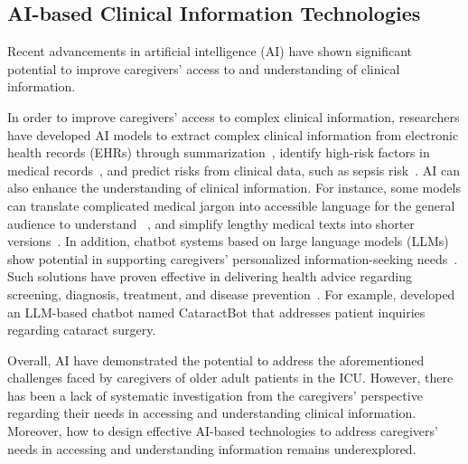 

\subsection{AI-based Clinical Information Technologies}
 
Recent advancements in artificial intelligence (AI) have shown significant potential to improve caregivers' access to and understanding of clinical information. 

In order to improve caregivers' access to complex clinical information, researchers have developed AI models to extract complex clinical information from electronic health records (EHRs) through summarization~\cite{Sette2023, Nikkhah2021, gopinath2020fast}, identify high-risk factors in medical records~\cite{corey2018development}, and predict risks from clinical data, such as sepsis risk~\cite{suresh2017clinical, yin2024sepsiscalc}. 
AI can also enhance the understanding of clinical information.
For instance, some models can translate complicated medical jargon into accessible language for the general audience to understand ~\cite{yim2024preliminary, wachter2024will, wong2018using}, and simplify lengthy medical texts into shorter versions~\cite{basu2023med, artsi2024large}. In addition, chatbot systems based on large language models (LLMs) show potential in supporting caregivers' personalized information-seeking needs~\cite{afshar2024prompt}. 
Such solutions have proven effective in delivering health advice regarding screening, diagnosis, treatment, and disease prevention~\cite{huo2025large}. 
For example, \citet{ramjee2024cataractbot} developed an LLM-based chatbot named CataractBot that addresses patient inquiries regarding cataract surgery.

Overall, AI have demonstrated the potential to address the aforementioned challenges faced by caregivers of older adult patients in the ICU. 
However, there has been a lack of systematic investigation from the caregivers' perspective regarding their needs in accessing and understanding clinical information.
Moreover, how to design effective AI-based technologies to address caregivers' needs in accessing and understanding information remains underexplored.


